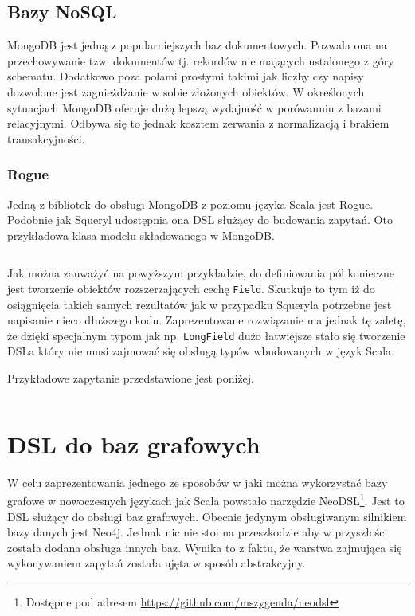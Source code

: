 \documentclass[brudnopis]{xmgr}
\begin{document}
\section{Bazy NoSQL}

MongoDB jest jedną z popularniejszych baz dokumentowych. Pozwala ona na przechowywanie tzw. dokumentów tj. rekordów nie mających ustalonego z góry schematu. Dodatkowo poza polami prostymi takimi jak liczby czy napisy dozwolone jest zagnieżdżanie w sobie złożonych obiektów. W określonych sytuacjach MongoDB oferuje dużą lepszą wydajność w porówanniu z bazami relacyjnymi. Odbywa się to jednak kosztem zerwania z normalizacją i brakiem transakcyjności.

\subsection{Rogue}

Jedną z bibliotek do obsługi MongoDB z poziomu języka Scala jest Rogue. Podobnie jak Squeryl udostępnia ona DSL służący do budowania zapytań. Oto przykładowa klasa modelu składowanego w MongoDB.

\inputminted{scala}{listings/scala/rogue-model.scala}

Jak można zauważyć na powyższym przykładzie, do definiowania pól konieczne jest tworzenie obiektów rozszerzających cechę \texttt{Field}. Skutkuje to tym iż do osiągnięcia takich samych rezultatów jak w przypadku Squeryla potrzebne jest napisanie nieco dłuższego kodu. Zaprezentowane rozwiązanie ma jednak tę zaletę, że dzięki specjalnym typom jak np. \texttt{LongField} dużo łatwiejsze stało się tworzenie DSLa który nie musi zajmować się obsługą typów wbudowanych w język Scala.

\medskip\noindent Przykładowe zapytanie przedstawione jest poniżej.

\inputminted{scala}{listings/scala/rogue-query.scala}

\chapter{DSL do baz grafowych}

W celu zaprezentowania jednego ze sposobów w jaki można wykorzystać bazy grafowe w nowoczesnych językach jak Scala powstało narzędzie NeoDSL\footnote{Dostępne pod adresem \url{https://github.com/mszygenda/neodsl}}. Jest to DSL służący do obsługi baz grafowych.
Obecnie jedynym obsługiwanym silnikiem bazy danych jest Neo4j. Jednak nic nie stoi na przeszkodzie aby w przyszłości została dodana obsługa innych baz. Wynika to z faktu, że warstwa zajmująca się wykonywaniem zapytań została ujęta w sposób abstrakcyjny.
\end{document}
